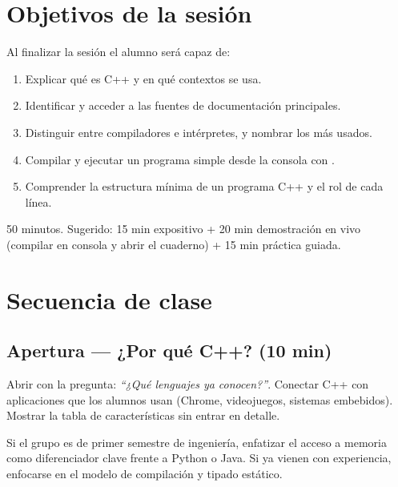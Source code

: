 \documentclass[12pt, oneside]{article}
\begin{document}

\tableofcontents
\newpage

\section{Objetivos de la sesión}

Al finalizar la sesión el alumno será capaz de:

\begin{enumerate}
  \item Explicar qué es C++ y en qué contextos se usa.
  \item Identificar y acceder a las fuentes de documentación principales.
  \item Distinguir entre compiladores e intérpretes, y nombrar los más usados.
  \item Compilar y ejecutar un programa simple desde la consola con .
  \item Comprender la estructura mínima de un programa C++ y el rol de cada línea.
\end{enumerate}

\begin{notaprofesor}
  50 minutos. Sugerido: 15 min expositivo + 20 min demostración en vivo
  (compilar en consola y abrir el cuaderno) + 15 min práctica guiada.
\end{notaprofesor}

\section{Secuencia de clase}

\subsection{Apertura — ¿Por qué C++? (10 min)}

Abrir con la pregunta: \textit{``¿Qué lenguajes ya conocen?''}.
Conectar C++ con aplicaciones que los alumnos usan (Chrome, videojuegos,
sistemas embebidos). Mostrar la tabla de características sin entrar en detalle.

\begin{notaprofesor}
  Si el grupo es de primer semestre de ingeniería, enfatizar el acceso a memoria
  como diferenciador clave frente a Python o Java. Si ya vienen con experiencia,
  enfocarse en el modelo de compilación y tipado estático.
\end{notaprofesor}
\end{document}
